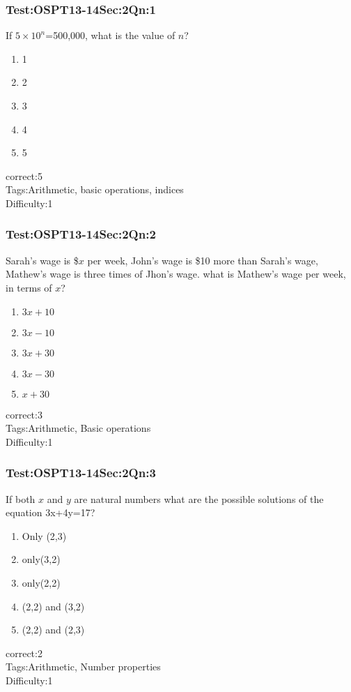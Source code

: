 \documentclass[]{beamer}
\begin{document}
    \begin{frame}
	    \frametitle{Test:OSPT13-14\hspace{2mm}Sec:2\hspace{2mm}Qn:1}
	    If $5\times10^n$=500,000, what is the value of $n$?
	   \begin{enumerate}
	        \item
	           1
	        \item
	            2
	        \item
	           3
	        \item
	            4
	        \item
	           5
	    \end{enumerate}
	    correct:5\\   
	    Tags:Arithmetic, basic operations, indices \\
	    Difficulty:1   \\
    \end{frame}    
    \begin{frame}
	    \frametitle{Test:OSPT13-14\hspace{2mm}Sec:2\hspace{2mm}Qn:2}
	    Sarah's wage is \$$x$ per week, John's wage is \$10 more than Sarah's wage, Mathew's wage is three times of Jhon's wage. what is Mathew's wage per week, in terms of $x$?
	   \begin{enumerate}
	        \item
	           $3x+10$
	        \item
	            $3x-10$
	        \item
	           $3x+30$
	        \item
	            $3x-30$
	        \item
	           $x+30$
	   \end{enumerate}
	    correct:3\\   
	    Tags:Arithmetic, Basic operations \\
	    Difficulty:1   \\
    \end{frame}    
    \begin{frame}
	    \frametitle{Test:OSPT13-14\hspace{2mm}Sec:2\hspace{2mm}Qn:3}
	    If both $x$ and $y$ are natural numbers what are the possible solutions of the equation 3x+4y=17?
	   \begin{enumerate}
	        \item
	           Only (2,3)
	        \item
	           only(3,2)
	        \item
	           only(2,2)
	        \item
	            (2,2) and (3,2)
	        \item
	           	(2,2) and (2,3)
	    \end{enumerate}
	    correct:2\\   
	    Tags:Arithmetic, Number properties \\
	    Difficulty:1   \\
    \end{frame}    
\end{document}

